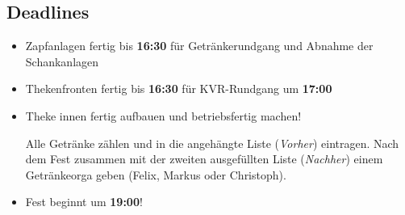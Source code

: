 \subsection{Deadlines}
\begin{itemize}
  \item Zapfanlagen fertig bis \textbf{16:30} für Getränkerundgang und Abnahme der Schankanlagen
  \item Thekenfronten fertig bis \textbf{16:30} für KVR-Rundgang um \textbf{17:00}
  \item Theke innen fertig aufbauen und betriebsfertig machen!

    Alle Getränke zählen und in die angehängte Liste (\emph{Vorher}) eintragen. Nach dem Fest zusammen mit der zweiten ausgefüllten Liste (\emph{Nachher}) einem Getränkeorga geben (Felix, Markus oder Christoph).
  \item \large{Fest beginnt um \textbf{19:00}!}
\end{itemize}
